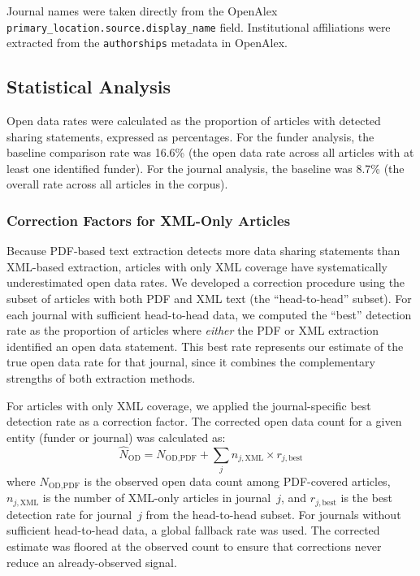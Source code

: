 Journal names were taken directly from the OpenAlex \texttt{primary\_location.source.display\_name} field. Institutional affiliations were extracted from the \texttt{authorships} metadata in OpenAlex.

\subsection{Statistical Analysis}

Open data rates were calculated as the proportion of articles with detected sharing statements, expressed as percentages. For the funder analysis, the baseline comparison rate was 16.6\% (the open data rate across all articles with at least one identified funder). For the journal analysis, the baseline was 8.7\% (the overall rate across all articles in the corpus).

\subsubsection{Correction Factors for XML-Only Articles}

Because PDF-based text extraction detects more data sharing statements than XML-based extraction, articles with only XML coverage have systematically underestimated open data rates. We developed a correction procedure using the subset of articles with both PDF and XML text (the ``head-to-head'' subset). For each journal with sufficient head-to-head data, we computed the ``best'' detection rate as the proportion of articles where \emph{either} the PDF or XML extraction identified an open data statement. This best rate represents our estimate of the true open data rate for that journal, since it combines the complementary strengths of both extraction methods.

For articles with only XML coverage, we applied the journal-specific best detection rate as a correction factor. The corrected open data count for a given entity (funder or journal) was calculated as:
\begin{equation}
\hat{N}_{\text{OD}} = N_{\text{OD,PDF}} + \sum_{j} n_{j,\text{XML}} \times r_{j,\text{best}}
\end{equation}
where $N_{\text{OD,PDF}}$ is the observed open data count among PDF-covered articles, $n_{j,\text{XML}}$ is the number of XML-only articles in journal~$j$, and $r_{j,\text{best}}$ is the best detection rate for journal~$j$ from the head-to-head subset. For journals without sufficient head-to-head data, a global fallback rate was used. The corrected estimate was floored at the observed count to ensure that corrections never reduce an already-observed signal.

